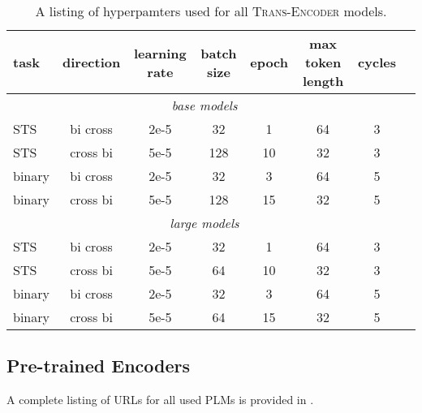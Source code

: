 \documentclass{article} \usepackage{iclr2021_conference,times}
\newcommand{\modelname}{\textsc{Trans-Encoder}\xspace}
\begin{document}
\begin{table*}[h] \small
\centering
\begin{tabular}{lccccccc}
\toprule
 task & direction & learning rate &  batch size & epoch & max token length & cycles \\
\midrule
\multicolumn{7}{c}{\textit{base models}} \\
\midrule
STS & bi  cross & 2e-5 & 32 & 1 & 64 & 3\\
STS & cross  bi & 5e-5 & 128 & 10 & 32 & 3\\
binary & bi  cross & 2e-5 & 32 & 3 & 64 & 5\\
binary & cross  bi & 5e-5 & 128 & 15 & 32 & 5 \\
\midrule
\multicolumn{7}{c}{\textit{large models}}  \\
\midrule
STS & bi  cross & 2e-5 & 32 & 1 & 64 & 3 \\
STS & cross  bi & 5e-5 & 64 & 10 & 32 & 3 \\
binary & bi  cross & 2e-5 & 32 & 3 & 64& 5 \\
binary & cross  bi & 5e-5 & 64 & 15 & 32 & 5 \\
\bottomrule
\end{tabular}
\caption{A listing of hyperpamters used for all \modelname models.}
\label{tab:hparams}
\end{table*}




\subsection{Pre-trained Encoders}\label{sec:appendix_huggingface_urls}
A complete listing of URLs for all used PLMs is provided in . 
\end{document}
